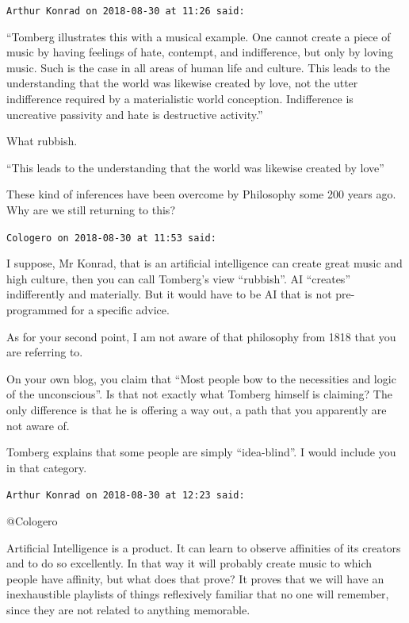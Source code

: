 \begin{footnotesize}
\begin{sffamily}

\texttt{Arthur Konrad on 2018-08-30 at 11:26 said:}

``Tomberg illustrates this with a musical example. One cannot create a piece of music by having feelings of hate, contempt, and indifference, but only by loving music. Such is the case in all areas of human life and culture. This leads to the understanding that the world was likewise created by love, not the utter indifference required by a materialistic world conception. Indifference is uncreative passivity and hate is destructive activity.''

What rubbish.

``This leads to the understanding that the world was likewise created by love''

These kind of inferences have been overcome by Philosophy some 200 years ago. Why are we still returning to this?

\hfill

\texttt{Cologero on 2018-08-30 at 11:53 said:}

I suppose, Mr Konrad, that is an artificial intelligence can create great music and high culture, then you can call Tomberg's view ``rubbish''. AI ``creates'' indifferently and materially. But it would have to be AI that is not pre-programmed for a specific advice.

As for your second point, I am not aware of that philosophy from 1818 that you are referring to.

On your own blog, you claim that ``Most people bow to the necessities and logic of the unconscious''. Is that not exactly what Tomberg himself is claiming? The only difference is that he is offering a way out, a path that you apparently are not aware of.

Tomberg explains that some people are simply ``idea-blind''. I would include you in that category.

\hfill

\texttt{Arthur Konrad on 2018-08-30 at 12:23 said:}

@Cologero

Artificial Intelligence is a product. It can learn to observe affinities of its creators and to do so excellently. In that way it will probably create music to which people have affinity, but what does that prove? It proves that we will have an inexhaustible playlists of things reflexively familiar that no one will remember, since they are not related to anything memorable.


\end{sffamily}
\end{footnotesize}
